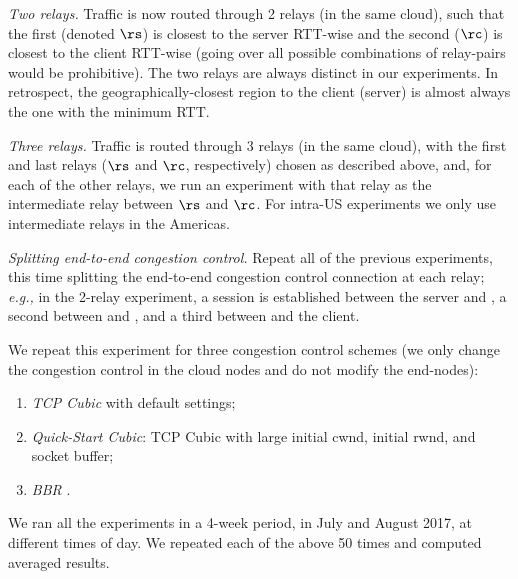 \documentclass{hotnets17}
\newcommand{\mycomm}[3]{{\color{#2} \textbf{[#1: #3]}}}
\newcommand{\mycomm}[3]{}
\newcommand{\IK}[1]{\mycomm{IK}{blue}{#1}}
\providecommand{\eg}{\emph{e.g.,} }
\def\compactify{\itemsep=0pt \topsep=0pt \partopsep=0pt \parsep=0pt}
\let\latexusecounter=\usecounter
\newenvironment{CompactEnumerate}
    {\def\usecounter{\compactify\latexusecounter}
     \begin{enumerate}}
    {\end{enumerate}\let\usecounter=\latexusecounter}
\newcommand{\U}[1]{\smallskip\noindent\textit{#1}} %
\begin{document}
\U{Two relays.} Traffic is now routed through 2 relays (in the same cloud), such that the first (denoted $\rs$) is closest to the server RTT-wise and the second ($\rc$) is closest to the client RTT-wise (going over all possible combinations of relay-pairs would be prohibitive). The two relays are always distinct in our experiments. %
In retrospect, the geographically-closest region to the client (server) is almost always the one with the minimum RTT.


\U{Three relays.} Traffic is routed through 3 relays (in the same cloud), with the first and last relays ($\rs$ and $\rc$, respectively) chosen as described above, and, for each of the other relays, we run an experiment with that relay as the intermediate relay between $\rs$ and $\rc$. For intra-US experiments we only use intermediate relays in the Americas.

\U{Splitting end-to-end congestion control.} Repeat all of the previous experiments, this time splitting the end-to-end congestion control connection at each relay; \eg in the 2-relay experiment, a session is established between the server and \rs, a second between \rs and \rc, and a third between \rc and the client.

We repeat this experiment for three congestion control schemes (we only change the congestion control in the cloud nodes and do not modify the end-nodes):
\begin{CompactEnumerate}
      \item \textit{TCP Cubic} with default settings;
      \item \textit{Quick-Start Cubic}: TCP Cubic with large initial cwnd, initial rwnd, and socket buffer;
      \item \textit{BBR} \cite{BBR}.
  \end{CompactEnumerate} 
We ran all the experiments in a 4-week period, in July and August 2017, at different times of day. We repeated each of the above 50 times and computed averaged results.
\end{document}
